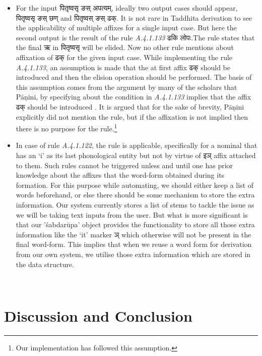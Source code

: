 \documentclass[11pt]{article}
\begin{document}
\begin{itemize}
\item For the input {\skt पितृष्वसृ ङस् अपत्यम्}, ideally two output cases should appear, {\skt पितृष्वसृ ङस् छण्  and पितृष्वस् ङस् ढक्}. It is not rare in Taddhita derivation to see the applicability of multiple affixes for a single input case. But here the second output is the result of the rule {\sl A.4.1.133} {\skt ढकि लोपः}.The rule states that the final {\skt ऋ} in {\skt पितृष्वसृ} will be elided. Now no other rule mentions about affixation of {\skt ढक्} for the given input case. While implementing the rule {\sl A.4.1.133}, an assumption is made that the at first affix {\skt ढक्} should be introduced and then the elision operation should be performed. The basis of this assumption comes from the argument by many of the scholars that Pāṇini, by specifying about the condition in {\sl A.4.1.133} implies that the affix {\skt ढक्} should be introduced \cite{rsbook}. It is argued that for the sake of brevity, Pāṇini explicitly did not mention the rule, but if the affixation is not implied then there is no purpose for the rule.\footnote{Our implementation has followed this assumption.}

\item In case of rule {\sl A.4.1.122}, the rule is applicable, specifically for a nominal that has an `i' as its last phonological entity but not by virtue of {\skt इञ्} affix attached to them. Such rules cannot be triggered unless and until one has prior knowledge about the affixes that the word-form obtained during its formation. For this purpose while automating, we should either keep a list of words beforehand, or else there should be some mechanism to store the extra information. Our system currently stores a list of stems to tackle the issue as we will be taking text inputs from the user. But what is more significant is that our 'śabdarūpa' object provides the functionality to store all those extra information like the `it' marker {\skt ञ्} which otherwise will not be present in the final word-form. This implies that when we reuse a word form for derivation from our own system, we utilise those extra information which are stored in the data structure.

\end{itemize}
\\

\section{Discussion and Conclusion}
\label{sect:conc}
\end{document}
